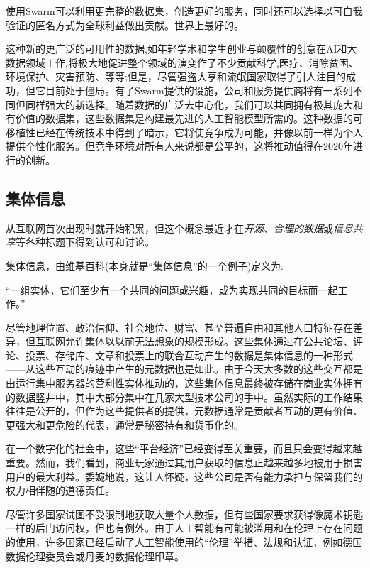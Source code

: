 使用Swarm可以利用更完整的数据集，创造更好的服务，同时还可以选择以可自我验证的匿名方式为全球利益做出贡献。世界上最好的。

这种新的更广泛的可用性的数据,如年轻学术和学生创业与颠覆性的创意在AI和大数据领域工作,将极大地促进整个领域的演变作了不少贡献科学,医疗、消除贫困、环境保护、灾害预防、等等;但是，尽管强盗大亨和流氓国家取得了引人注目的成功，但它目前处于僵局。有了Swarm提供的设施，公司和服务提供商将有一系列不同但同样强大的新选择。随着数据的广泛去中心化，我们可以共同拥有极其庞大和有价值的数据集，这些数据集是构建最先进的人工智能模型所需的。这种数据的可移植性已经在传统技术中得到了暗示，它将使竞争成为可能，并像以前一样为个人提供个性化服务。但竞争环境对所有人来说都是公平的，这将推动值得在2020年进行的创新。 



\subsection{集体信息\statusgreen}\label{sec:collective_information}

从互联网首次出现时就开始积累，但这个概念最近才在\emph{开源}、\emph{合理的数据}或\emph{信息共享}等各种标题下得到认可和讨论。

集体信息，由维基百科(本身就是“集体信息”的一个例子)定义为:
\begin{displayquote}
“一组实体，它们至少有一个共同的问题或兴趣，或为实现共同的目标而一起工作。” 
\end{displayquote}
尽管地理位置、政治信仰、社会地位、财富、甚至普遍自由和其他人口特征存在差异，但互联网允许集体以以前无法想象的规模形成。这些集体通过在公共论坛、评论、投票、存储库、文章和投票上的联合互动产生的数据是集体信息的一种形式——从这些互动的痕迹中产生的元数据也是如此。由于今天大多数的这些交互都是由运行集中服务器的营利性实体推动的，这些集体信息最终被存储在商业实体拥有的数据竖井中，其中大部分集中在几家大型技术公司的手中。虽然实际的工作结果往往是公开的，但作为这些提供者的提供，元数据通常是贡献者互动的更有价值、更强大和更危险的代表，通常是秘密持有和货币化的。

在一个数字化的社会中，这些“平台经济”已经变得至关重要，而且只会变得越来越重要。然而，我们看到，商业玩家通过其用户获取的信息正越来越多地被用于损害用户的最大利益。委婉地说，这让人怀疑，这些公司是否有能力承担与保留我们的权力相伴随的道德责任。

尽管许多国家试图不受限制地获取大量个人数据，但有些国家要求获得像魔术钥匙一样的后门访问权，但也有例外。由于人工智能有可能被滥用和在伦理上存在问题的使用，许多国家已经启动了人工智能使用的“伦理”举措、法规和认证，例如德国数据伦理委员会或丹麦的数据伦理印章。 

